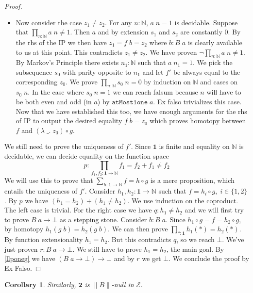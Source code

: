 \documentclass[12pt]{report}
\newtheorem{cor}[thm]{Corollary}
\begin{document}
\begin{proof}
\begin{itemize}
\item Now consider the case $z_1 \neq z_2$. 
For any $n : \mathbb{N}$, $a\; n = 1$ is decidable. 
Suppose that $\prod_{n : 
\mathbb{N}} a\; n \neq 1$. 
Then $a$ and by extension $s_1$ and $s_2$ are constantly $0$. 
By the rhs of the IP we then have $z_1 = f\; b = z_2$ where $b : B\; a$ is clearly available to us at this point. 
This contradicts $z_1 \neq z_2$. 
We have proven $\neg \prod_{n : 
\mathbb{N}} a\; n \neq 1$. 
By Markov's Principle there exists $n_1 : \mathbb{N}$ such that $a\; n_1 = 1$. 
We pick the subsequence $s_0$ with parity opposite to $n_1$ and let $f'$ be always equal to the corresponding $z_0$. 
We prove $\prod_{n : \mathbb{N}} s_0\; n = 0$ by induction on $\mathbb{N}$ and cases on $s_0 \;n$. 
In the case where $s_0\; n = 1$ we can reach falsum because $n$ will have to be both even and odd (in $a$) by $\mathtt{atMost1one} \; a$. Ex falso trivializes this case. 
Now that we have established this too, we have enough arguments for the rhs of IP to output the desired equality $f\; b = z_0$ which proves homotopy between $f$ and $(\lambda\;\_.\; z_0) \circ g$.
\end{itemize}
We still need to prove the uniqueness of $f'$. 
Since $\mathbf{1}$ is finite and equality on $\mathbb{N}$ is decidable, we can decide equality on the function space 
$$p : \prod_{f_1,f_2 : \mathbf{1}\rightarrow \mathbb{N}} f_1 = f_2 + f_1 \neq f_2$$
We will use this to prove that $\sum_{h : \mathbf{1}\rightarrow \mathbb{N}} f= h \circ g$ is a mere proposition, which entails the uniqueness of $f'$. 
Consider $h_1,h_2 : \mathbf{1}\rightarrow \mathbb{N}$ such that $f= h_i \circ g,\; i \in \{1,2\}$. 
By $p$ we have $(h_1 = h_2) + (h_1 \neq h_2)$. 
We use induction on the coproduct. 
The left case is trivial. 
For the right case we have $q : h_1 \neq h_2$ and we will first try to prove $B\; a \rightarrow \bot$ as a stepping stone. 
Consider $b : B\; a$. 
Since $h_1 \circ g = f = h_2 \circ g$, by homotopy $h_1 (g\; b) = h_2 (g\; b)$. 
We can then prove $\prod_{*: \mathbf{1}} h_1 (*) = h_2 (*)$. 
By function extensionality $h_1 = h_2$. 
But this contradicts $q$, so we reach $\bot$. 
We've just proven $r : B\;a \rightarrow \bot$. 
We still have to prove $h_1 = h_2$, the main goal. 
By \cref{llponeg} we have $(B\; a \rightarrow \bot) \rightarrow \bot$ and by $r$ we get $\bot$. 
We conclude the proof by Ex Falso.
\end{proof}

\begin{cor}
Similarly, $\mathbf{2}$ is $\lVert B \rVert$-null in $\mathcal{E}$. 
\end{cor}
\end{document}
